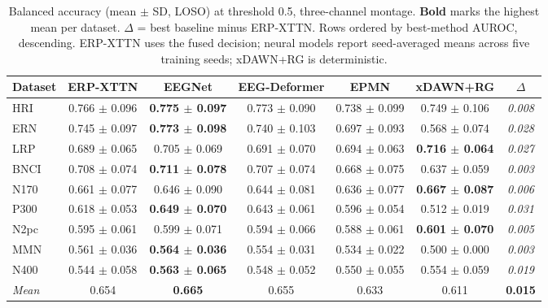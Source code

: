 \begin{table}[t]
\centering
\setlength{\tabcolsep}{5pt}
\caption{Balanced accuracy (mean $\pm$ SD, LOSO) at threshold 0.5, three-channel montage. \textbf{Bold} marks the highest mean per dataset. $\Delta$ = best baseline minus ERP-XTTN. Rows ordered by best-method AUROC, descending. ERP-XTTN uses the fused decision; neural models report seed-averaged means across five training seeds; xDAWN+RG is deterministic.}
\label{sup:tab-balacc}
\begin{tabular}{lcccccc}
\toprule
Dataset & ERP-XTTN & EEGNet & EEG-Deformer & EPMN & xDAWN+RG & $\Delta$ \\
\midrule
HRI & 0.766 $\pm$ 0.096 & \textbf{0.775 $\pm$ 0.097} & 0.773 $\pm$ 0.090 & 0.738 $\pm$ 0.099 & 0.749 $\pm$ 0.106 & \textit{0.008} \\
ERN & 0.745 $\pm$ 0.097 & \textbf{0.773 $\pm$ 0.098} & 0.740 $\pm$ 0.103 & 0.697 $\pm$ 0.093 & 0.568 $\pm$ 0.074 & \textit{0.028} \\
LRP & 0.689 $\pm$ 0.065 & 0.705 $\pm$ 0.069 & 0.691 $\pm$ 0.070 & 0.694 $\pm$ 0.063 & \textbf{0.716 $\pm$ 0.064} & \textit{0.027} \\
BNCI & 0.708 $\pm$ 0.074 & \textbf{0.711 $\pm$ 0.078} & 0.707 $\pm$ 0.074 & 0.668 $\pm$ 0.075 & 0.637 $\pm$ 0.059 & \textit{0.003} \\
N170 & 0.661 $\pm$ 0.077 & 0.646 $\pm$ 0.090 & 0.644 $\pm$ 0.081 & 0.636 $\pm$ 0.077 & \textbf{0.667 $\pm$ 0.087} & \textit{0.006} \\
P300 & 0.618 $\pm$ 0.053 & \textbf{0.649 $\pm$ 0.070} & 0.643 $\pm$ 0.061 & 0.596 $\pm$ 0.054 & 0.512 $\pm$ 0.019 & \textit{0.031} \\
N2pc & 0.595 $\pm$ 0.061 & 0.599 $\pm$ 0.071 & 0.594 $\pm$ 0.066 & 0.588 $\pm$ 0.061 & \textbf{0.601 $\pm$ 0.070} & \textit{0.005} \\
MMN & 0.561 $\pm$ 0.036 & \textbf{0.564 $\pm$ 0.036} & 0.554 $\pm$ 0.031 & 0.534 $\pm$ 0.022 & 0.500 $\pm$ 0.000 & \textit{0.003} \\
N400 & 0.544 $\pm$ 0.058 & \textbf{0.563 $\pm$ 0.065} & 0.548 $\pm$ 0.052 & 0.550 $\pm$ 0.055 & 0.554 $\pm$ 0.059 & \textit{0.019} \\
\midrule
\textit{Mean} & 0.654 & \textbf{0.665} & 0.655 & 0.633 & 0.611 & \textbf{0.015} \\
\bottomrule
\end{tabular}
\end{table}
